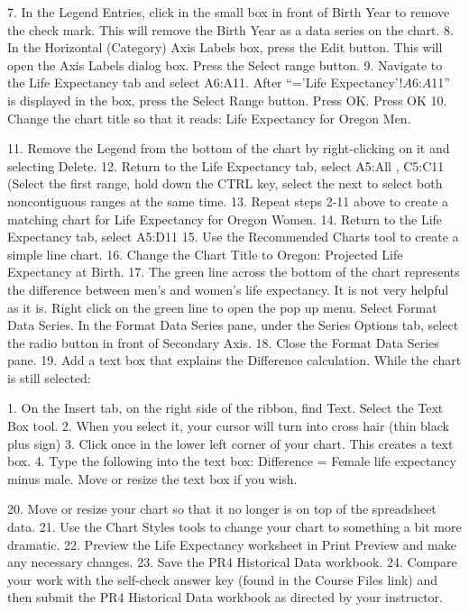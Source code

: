 7. In the Legend Entries, click in the small box in front of Birth Year to remove the check mark.
This will remove the Birth Year as a data series on the chart.
8. In the Horizontal (Category) Axis Labels box, press the Edit button. This will open the Axis
Labels dialog box. Press the Select range button.
9. Navigate to the Life Expectancy tab and select A6:A11. After “=’Life Expectancy’!$A$6:$A$11”
is displayed in the box, press the Select Range button. Press OK.
Press OK
10. Change the chart title so that it reads: Life Expectancy for Oregon Men.


11. Remove the Legend from the bottom of the chart by right-clicking on it and selecting Delete.
12. Return to the Life Expectancy tab, select A5:All , C5:C11 (Select the first range, hold down the
CTRL key, select the next to select both noncontiguous ranges at the same time.
13. Repeat steps 2-11 above to create a matching chart for Life Expectancy for Oregon Women.
14. Return to the Life Expectancy tab, select A5:D11
15. Use the Recommended Charts tool to create a simple line chart.
16. Change the Chart Title to Oregon: Projected Life Expectancy at Birth.
17. The green line across the bottom of the chart represents the difference between men’s and
women’s life expectancy. It is not very helpful as it is.
Right click on the green line to open the pop up menu. Select Format Data Series. In the
Format Data Series pane, under the Series Options tab, select the radio button in front of
Secondary Axis.
18. Close the Format Data Series pane.
19. Add a text box that explains the Difference calculation. While the chart is still selected:

1.   On the Insert tab, on the right side of the ribbon, find Text. Select the Text Box tool.
2.   When you select it, your cursor will turn into cross hair (thin black plus sign)
3.   Click once in the lower left corner of your chart. This creates a text box.
4.   Type the following into the text box: Difference = Female life expectancy minus male.
Move or resize the text box if you wish.

20.   Move or resize your chart so that it no longer is on top of the spreadsheet data.
21.   Use the Chart Styles tools to change your chart to something a bit more dramatic.
22.   Preview the Life Expectancy worksheet in Print Preview and make any necessary changes.
23.   Save the PR4 Historical Data workbook.
24.   Compare your work with the self-check answer key (found in the Course Files link) and then
submit the PR4 Historical Data workbook as directed by your instructor.

